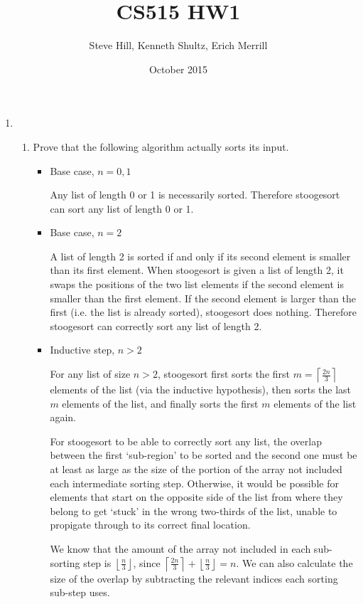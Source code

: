 \documentclass{article}
\title{CS515 HW1}
\author{Steve Hill, Kenneth Shultz, Erich Merrill}
\date{October 2015}
\newcommand{\ceil}[1]{\left\lceil#1\right\rceil}
\newcommand{\floor}[1]{\left\lfloor#1\right\rfloor}
\newcommand{\question}[1]{\bgroup\color{blue}#1\egroup}
\begin{document}
\maketitle

\begin{enumerate}
\item 
    \begin{enumerate}
    \item 
      \question{Prove that the following algorithm actually sorts its input.}

  \begin{itemize}
  \item Base case, $n=0,1$

  Any list of length 0 or 1 is necessarily sorted. Therefore stoogesort can sort any list of length 0 or 1.

  \item Base case, $n=2$

  A list of length 2 is sorted if and only if its second element is smaller than its first element. 
  When stoogesort is given a list of length 2, it swaps the positions of the two list elements if the second element is smaller than the first element. If the second element is larger than the first (i.e. the list is already sorted), stoogesort does nothing.
  Therefore stoogesort can correctly sort any list of length 2.

  \item Inductive step, $n>2$

  For any list of size $n > 2$, stoogesort first sorts the first $m=\ceil{\frac{2n}{3}}$ elements of the list (via the inductive hypothesis), then sorts the last $m$ elements of the list, and finally sorts the first $m$ elements of the list again.
  
  For stoogesort to be able to correctly sort any list, the overlap between the first `sub-region' to be sorted and the second one must be at least as large as the size of the portion of the array not included each intermediate sorting step.
  Otherwise, it would be possible for elements that start on the opposite side of the list from where they belong to get `stuck' in the wrong two-thirds of the list, unable to propigate through to its correct final location.

  We know that the amount of the array not included in each sub-sorting step is $\floor{\frac{n}{3}}$, since $\ceil{\frac{2n}{3}} + \floor{\frac{n}{3}} = n$. We can also calculate the size of the overlap by subtracting the relevant indices each sorting sub-step uses.


\end{itemize}
\end{enumerate}
\end{enumerate}
\end{document}
